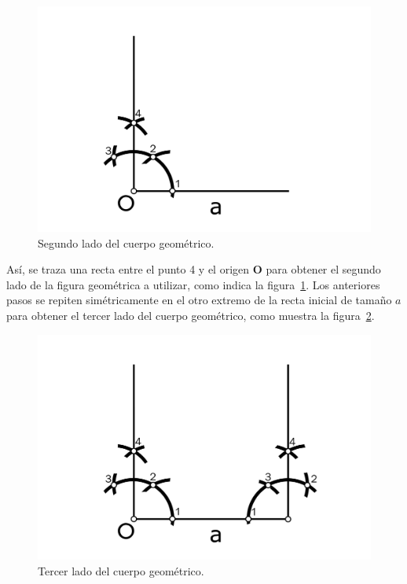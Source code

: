 \begin{figure}[H]
\centering
\includegraphics[scale=0.75]{Figures/Cuad6}
\caption[Segundo lado del cuerpo geométrico.]{Segundo lado del cuerpo geométrico.}
\label{fig:TrazFig6}
\end{figure}

Así, se traza una recta entre el punto 4 y el origen \textbf{O} para obtener el segundo lado de la figura geométrica a utilizar, como indica la figura~\ref{fig:TrazFig6}. Los anteriores pasos se repiten simétricamente en el otro extremo de la recta inicial de tamaño $a$ para obtener el tercer lado del cuerpo geométrico, como muestra la figura~\ref{fig:TrazFig7}.

\begin{figure}[H]
\centering
\includegraphics[scale=0.75]{Figures/Cuad7}
\caption[Tercer lado del cuerpo geométrico.]{Tercer lado del cuerpo geométrico.}
\label{fig:TrazFig7}
\end{figure}

